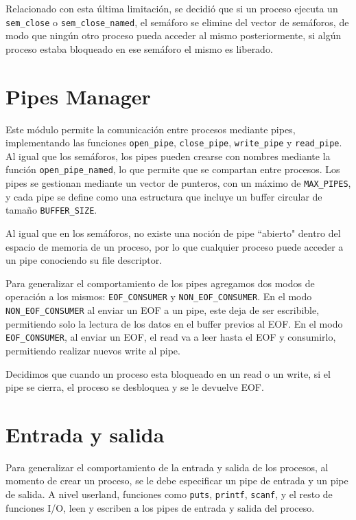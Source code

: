 \documentclass{article}
\begin{document}
Relacionado con esta última limitación, se decidió que si un proceso ejecuta un \texttt{sem\_close} o \texttt{sem\_close\_named}, el semáforo se elimine del vector de semáforos, de modo que ningún otro proceso pueda acceder al mismo posteriormente, si algún proceso estaba bloqueado en ese semáforo el mismo es liberado. 

\section{Pipes Manager}
Este módulo permite la comunicación entre procesos mediante pipes, implementando las funciones \texttt{open\_pipe}, \texttt{close\_pipe}, \texttt{write\_pipe} y \texttt{read\_pipe}. Al igual que los semáforos, los pipes pueden crearse con nombres mediante la función \texttt{open\_pipe\_named}, lo que permite que se compartan entre procesos. Los pipes se gestionan mediante un vector de punteros, con un máximo de \texttt{MAX\_PIPES}, y cada pipe se define como una estructura que incluye un buffer circular de tamaño \texttt{BUFFER\_SIZE}.

Al igual que en los semáforos, no existe una noción de pipe ``abierto" dentro del espacio de memoria de un proceso, por lo que cualquier proceso puede acceder a un pipe conociendo su file descriptor.

Para generalizar el comportamiento de los pipes agregamos dos modos de operación a los mismos: \texttt{EOF\_CONSUMER} y  \texttt{NON\_EOF\_CONSUMER}. En el modo \texttt{NON\_EOF\_CONSUMER} al enviar un EOF a un pipe, este deja de ser escribible, permitiendo solo la lectura de los datos en el buffer previos al EOF. En el modo \texttt{EOF\_CONSUMER}, al enviar un EOF, el read va a leer hasta el EOF y consumirlo, permitiendo realizar nuevos write al pipe.

Decidimos que cuando un proceso esta bloqueado en un read o un write, si el pipe se cierra, el proceso se desbloquea y se le devuelve EOF.

\section {Entrada y salida}
Para generalizar el comportamiento de la entrada y salida de los procesos, al momento de crear un proceso, se le debe especificar un pipe de entrada y un pipe de salida. A nivel userland, funciones como \texttt{puts}, \texttt{printf}, \texttt{scanf}, y el resto de funciones I/O, leen y escriben a los pipes de entrada y salida del proceso.
\end{document}
